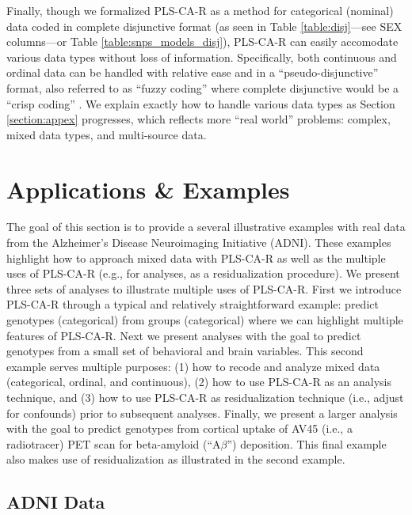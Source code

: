 \documentclass[12pt]{article}
\begin{document}
Finally, though we formalized PLS-CA-R as a method for categorical
(nominal) data coded in complete disjunctive format (as seen in Table
\ref{table:disj}---see SEX columns---or Table
\ref{table:snps_models_disj}), PLS-CA-R can easily accomodate various
data types without loss of information. Specifically, both continuous
and ordinal data can be handled with relative ease and in a
``pseudo-disjunctive'' format, also referred to as ``fuzzy coding''
where complete disjunctive would be a ``crisp coding''
\citep{greenacrefuzzy}. We explain exactly how to handle various data
types as Section \ref{section:appex} progresses, which reflects more
``real world'' problems: complex, mixed data types, and multi-source
data.

\hypertarget{applications-examples}{%
\section{Applications \& Examples}\label{applications-examples}}

\label{section:appex}

The goal of this section is to provide a several illustrative examples
with real data from the Alzheimer's Disease Neuroimaging Initiative
(ADNI). These examples highlight how to approach mixed data with
PLS-CA-R as well as the multiple uses of PLS-CA-R (e.g., for analyses,
as a residualization procedure). We present three sets of analyses to
illustrate multiple uses of PLS-CA-R. First we introduce PLS-CA-R
through a typical and relatively straightforward example: predict
genotypes (categorical) from groups (categorical) where we can highlight
multiple features of PLS-CA-R. Next we present analyses with the goal to
predict genotypes from a small set of behavioral and brain variables.
This second example serves multiple purposes: (1) how to recode and
analyze mixed data (categorical, ordinal, and continuous), (2) how to
use PLS-CA-R as an analysis technique, and (3) how to use PLS-CA-R as
residualization technique (i.e., adjust for confounds) prior to
subsequent analyses. Finally, we present a larger analysis with the goal
to predict genotypes from cortical uptake of AV45 (i.e., a radiotracer)
PET scan for beta-amyloid (``A\(\beta\)'') deposition. This final
example also makes use of residualization as illustrated in the second
example.

\hypertarget{adni-data}{%
\subsection{ADNI Data}\label{adni-data}}
\end{document}
